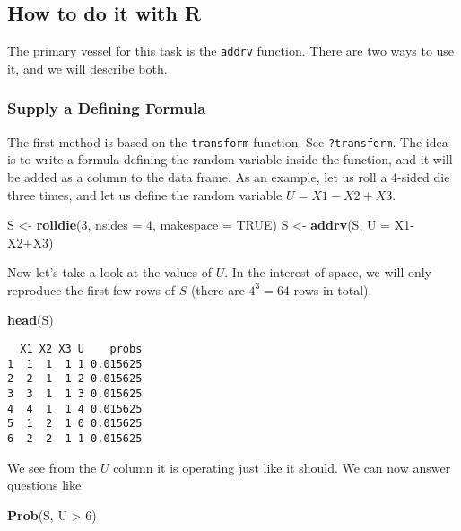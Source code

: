 \documentclass[]{book}
\newenvironment{Shaded}{\begin{snugshade}}{\end{snugshade}}
\newcommand{\KeywordTok}[1]{\textcolor[rgb]{0.13,0.29,0.53}{\textbf{{#1}}}}
\newcommand{\DataTypeTok}[1]{\textcolor[rgb]{0.13,0.29,0.53}{{#1}}}
\newcommand{\DecValTok}[1]{\textcolor[rgb]{0.00,0.00,0.81}{{#1}}}
\newcommand{\StringTok}[1]{\textcolor[rgb]{0.31,0.60,0.02}{{#1}}}
\newcommand{\OtherTok}[1]{\textcolor[rgb]{0.56,0.35,0.01}{{#1}}}
\newcommand{\NormalTok}[1]{{#1}}
\numberwithin{equation}{chapter}
\numberwithin{figure}{chapter}
\theoremstyle{plain}
\theoremstyle{definition}
\theoremstyle{remark}
\theoremstyle{definition}
\theoremstyle{definition}
\theoremstyle{remark}
\begin{document}
\subsection{How to do it with R}\label{how-to-do-it-with-r-19}

The primary vessel for this task is the \texttt{addrv} function. There
are two ways to use it, and we will describe both.

\subsubsection{Supply a Defining
Formula}\label{supply-a-defining-formula}

The first method is based on the \texttt{transform} function. See
\texttt{?transform}. The idea is to write a formula defining the random
variable inside the function, and it will be added as a column to the
data frame. As an example, let us roll a 4-sided die three times, and
let us define the random variable \(U=X1-X2+X3\).

\begin{Shaded}
\begin{Highlighting}[]
\NormalTok{S <-}\StringTok{ }\KeywordTok{rolldie}\NormalTok{(}\DecValTok{3}\NormalTok{, }\DataTypeTok{nsides =} \DecValTok{4}\NormalTok{, }\DataTypeTok{makespace =} \OtherTok{TRUE}\NormalTok{) }
\NormalTok{S <-}\StringTok{ }\KeywordTok{addrv}\NormalTok{(S, }\DataTypeTok{U =} \NormalTok{X1-X2+X3) }
\end{Highlighting}
\end{Shaded}

Now let's take a look at the values of \(U\). In the interest of space,
we will only reproduce the first few rows of \(S\) (there are
\(4^{3}=64\) rows in total).

\begin{Shaded}
\begin{Highlighting}[]
\KeywordTok{head}\NormalTok{(S)}
\end{Highlighting}
\end{Shaded}

\begin{verbatim}
  X1 X2 X3 U    probs
1  1  1  1 1 0.015625
2  2  1  1 2 0.015625
3  3  1  1 3 0.015625
4  4  1  1 4 0.015625
5  1  2  1 0 0.015625
6  2  2  1 1 0.015625
\end{verbatim}

We see from the \(U\) column it is operating just like it should. We can
now answer questions like

\begin{Shaded}
\begin{Highlighting}[]
\KeywordTok{Prob}\NormalTok{(S, U >}\StringTok{ }\DecValTok{6}\NormalTok{) }
\end{Highlighting}
\end{Shaded}
\end{document}
